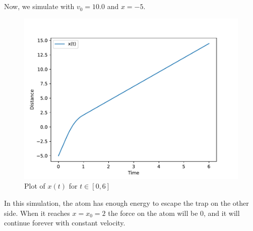\documentclass[a4paper,10pt,english]{article}
\begin{document}
\section{}
Now, we simulate with $v_0 = 10.0$ and $x=-5$.
\begin{figure}[h!]
    \centering
    \includegraphics[scale=.7]{plot_integrated_v0_10.pdf}
    \caption{Plot of $x(t)$ for $t\in[0, 6]$}
    \label{fig:fig_j}
\end{figure}

In this simulation, the atom has enough energy to escape the trap on the other side. When it reaches $x=x_0=2$ the force on the atom will be 0, and it will continue forever with constant velocity. 
\end{document}
